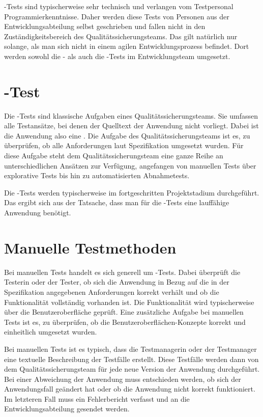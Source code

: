 \SuperPar
{}-Tests sind typischerweise sehr technisch und verlangen vom Testpersonal Programmierkenntnisse. Daher werden diese Tests von Personen aus der Entwicklungsabteilung selbst geschrieben und fallen nicht in den Zuständigkeitsbereich des Qualitätssicherungsteams. Das gilt natürlich nur solange, als man sich nicht in einem agilen Entwicklungsprozess befindet. Dort werden sowohl die - als auch die -Tests im Entwicklungsteam umgesetzt.


\section{-Test}

Die -Tests sind klassische Aufgaben eines Qualitätssicherungsteams. Sie umfassen alle Testansätze, bei denen der Quelltext der Anwendung nicht vorliegt. Dabei ist die Anwendung also eine . Die Aufgabe des Qualitätssicherungsteams ist es, zu überprüfen, ob alle Anforderungen laut Spezifikation umgesetzt wurden. Für diese Aufgabe steht dem Qualitätssicherungsteam eine ganze Reihe an unterschiedlichen Ansätzen zur Verfügung, angefangen von manuellen Tests über explorative Tests bis hin zu automatisierten Abnahmetests. 

\SuperPar
Die -Tests werden typischerweise im fortgeschritten Projektstadium durchgeführt. Das ergibt sich aus der Tatsache, dass man für die -Tests eine lauffähige Anwendung benötigt.

\section{Manuelle Testmethoden}

Bei manuellen Tests handelt es sich generell um -Tests. Dabei überprüft die Testerin oder der Tester, ob sich die Anwendung in Bezug auf die in der Spezifikation angegebenen Anforderungen korrekt verhält und ob die Funktionalität vollständig vorhanden ist. Die Funktionalität wird typischerweise über die Benutzeroberfläche geprüft. Eine zusätzliche Aufgabe bei manuellen Tests ist es, zu überprüfen, ob die Benutzeroberflächen-Konzepte korrekt und einheitlich umgesetzt wurden.

\SuperPar
Bei manuellen Tests ist es typisch, dass die Testmanagerin oder der Testmanager eine textuelle Beschreibung der Testfälle erstellt. Diese Testfälle werden dann von dem Qualitätssicherungsteam für jede neue Version der Anwendung durchgeführt. Bei einer Abweichung der Anwendung muss entschieden werden, ob sich der Anwendungsfall geändert hat oder ob die Anwendung nicht korrekt funktioniert. Im letzteren Fall muss ein Fehlerbericht verfasst und an die Entwicklungsabteilung gesendet werden.

